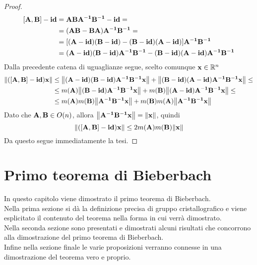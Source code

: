 \documentclass[a4paper,11pt,openright,twoside	]{book}
\begin{document}
\begin{proof}
\begin{equation*}
\begin{split}
[\vb{A,B}] - \vb{id} & = \vb{ABA^{-1}B^{-1} - id } = \\
& = \vb{(AB -BA)A^{-1}B^{-1} } = \\
& = [ \vb{ (A-id)(B-id) - (B-id)(A-id)}] \vb{A^{-1}B^{-1}} \\
& = \vb{( A-id)(B-id) A^{-1}B^{-1} -  (B-id)(A-id) A^{-1}B^{-1}}
\end{split}
\end{equation*}  
Dalla precedente catena di uguaglianze segue, scelto comunque $\vb{x} \in \mathbb{R}^n $
 \begin{equation*} 
\begin{split}
\norm{\vb{([A,B] - id )x}} & \leq \norm{\vb{ ( A-id)(B-id) A^{-1}B^{-1}x}} +  \norm{\vb{(B-id)(A-id) A^{-1}B^{-1}x}} \leq \\
& \leq m(\vb{A}) \norm{\vb{(B-id) A^{-1}B^{-1}x}} + m(\vb{B}) \norm{\vb{(A-id) A^{-1}B^{-1}x}} \leq \\ 
& \leq m(\vb{A})m(\vb{B})\norm{\vb{A^{-1}B^{-1}x}} + m(\vb{B})m(\vb{A}) \norm{\vb{A^{-1}B^{-1}x}}
\end{split}
\end{equation*}
Dato che $ \vb{A,B} \in O(n)$, allora $\norm{\vb{A^{-1}B^{-1}x}} = \norm{\vb{x}} $, quindi 
\begin{equation*}
  \norm{\vb{([A,B] - id )x}}  \leq 2m(\vb{A})m(\vb{B})\norm{\vb{x}}
\end{equation*} 
Da questo segue immediatamente la tesi. 
\end{proof}

\chapter{Primo teorema di Bieberbach}
In questo capitolo viene dimostrato il primo teorema di Bieberbach. \\
Nella prima sezione si dà la definizione precisa di gruppo cristallografico e viene esplicitato il contenuto del teorema nella forma in cui verrà dimostrato. \\
Nella seconda sezione sono presentati e dimostrati alcuni risultati che concorrono alla dimostrazione del primo teorema di Bieberbach. \\ 
Infine nella sezione finale le varie proposizioni verranno connesse in una dimostrazione del teorema vero e proprio.  \\
\end{document}
